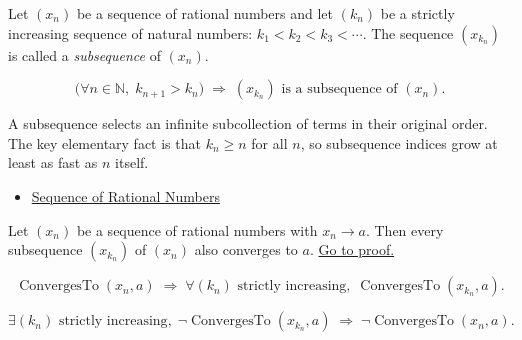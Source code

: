 \begin{definition}
\label{def:subsequence-q}
Let $(x_n)$ be a sequence of rational numbers and let $(k_n)$ be a strictly
increasing sequence of natural numbers:
$k_1 < k_2 < k_3 < \cdots$.
The sequence $(x_{k_n})$ is called a \emph{subsequence} of $(x_n)$.
\end{definition}

\begin{remark*}
\[
\bigl(\forall n \in \mathbb{N},\; k_{n+1} > k_n\bigr)
\;\Longrightarrow\;
(x_{k_n}) \text{ is a subsequence of } (x_n).
\]
\end{remark*}

\begin{remark*}[Interpretation]
A subsequence selects an infinite subcollection of terms in their original
order. The key elementary fact is that $k_n \geq n$ for all $n$, so
subsequence indices grow at least as fast as $n$ itself.
\end{remark*}

\begin{dependencies}
\begin{itemize}
  \item \hyperref[def:rational-sequence]{Sequence of Rational Numbers}
\end{itemize}
\end{dependencies}

\begin{theorem}
\label{thm:subsequence-convergence-q}
Let $(x_n)$ be a sequence of rational numbers with $x_n \to a$.
Then every subsequence $(x_{k_n})$ of $(x_n)$ also converges to $a$.
\hyperref[prf:subsequence-convergence-q]{Go to proof.}
\end{theorem}

\begin{remark*}
\[
\operatorname{ConvergesTo}(x_n, a)
\;\Longrightarrow\;
\forall (k_n) \text{ strictly increasing},\;
\operatorname{ConvergesTo}(x_{k_n}, a).
\]
\end{remark*}

\begin{remark*}
\[
\exists (k_n) \text{ strictly increasing},\;
\neg\operatorname{ConvergesTo}(x_{k_n}, a)
\;\Longrightarrow\;
\neg\operatorname{ConvergesTo}(x_n, a).
\]
\end{remark*}

